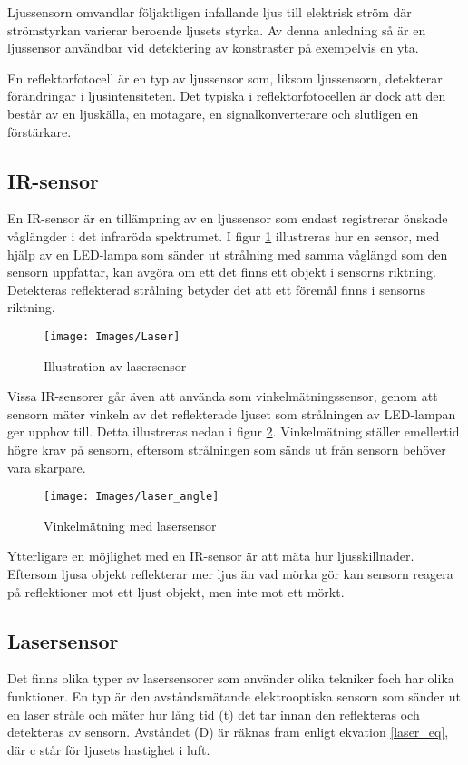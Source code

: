 \documentclass[11pt]{article}
\begin{document}
\begin{flushleft}
Ljussensorn omvandlar följaktligen infallande ljus till elektrisk ström där strömstyrkan varierar beroende ljusets styrka. Av denna anledning så är en ljussensor användbar vid detektering av konstraster på exempelvis en yta. \cite{612896}

En reflektorfotocell är en typ av ljussensor som, liksom ljussensorn, detekterar förändringar i ljusintensiteten. Det typiska i reflektorfotocellen är dock att den  består av en ljuskälla, en motagare, en signalkonverterare och slutligen en förstärkare. \cite{website:automation} 


\subsection{IR-sensor}
En IR-sensor är en tillämpning av en ljussensor som endast registrerar önskade våglängder i det infraröda spektrumet. I figur \ref{Laser} illustreras hur en sensor, med hjälp av en LED-lampa som sänder ut strålning med samma våglängd som den sensorn uppfattar, kan avgöra om ett det finns ett objekt i sensorns riktning. Detekteras reflekterad strålning betyder det att ett föremål finns i sensorns riktning. \cite{website:cmu}

\begin{figure}[htbp]
	\centering
	\texttt{[image: Images/Laser]}
	\caption{Illustration av lasersensor \label{Laser}}
\end{figure}

\pagebreak
Vissa IR-sensorer går även att använda som vinkelmätningssensor, genom att sensorn mäter vinkeln av det reflekterade ljuset som strålningen av LED-lampan ger upphov till. Detta illustreras nedan i figur \ref{laser_angle}. Vinkelmätning ställer emellertid högre krav på sensorn, eftersom strålningen som sänds ut från sensorn behöver vara skarpare.

\begin{figure}[htbp]
	\centering
	\texttt{[image: Images/laser\_angle]}
	\caption{Vinkelmätning med lasersensor \label{laser_angle}}
\end{figure}

Ytterligare en möjlighet med en IR-sensor är att mäta hur ljusskillnader. Eftersom ljusa objekt reflekterar mer ljus än vad mörka gör kan sensorn reagera på reflektioner mot ett ljust objekt, men inte mot ett mörkt. \cite{website:cmu}

\subsection{Lasersensor}
Det finns olika typer av lasersensorer som använder olika tekniker foch har olika funktioner. En typ är den avståndsmätande elektrooptiska sensorn som sänder ut en laser stråle och mäter hur lång tid (t) det tar innan den reflekteras och detekteras av sensorn. Avståndet (D) är räknas fram enligt ekvation \ref{laser_eq}, där c står för ljusets hastighet i luft. \cite{website:mti}



\end{flushleft}
\end{document}
